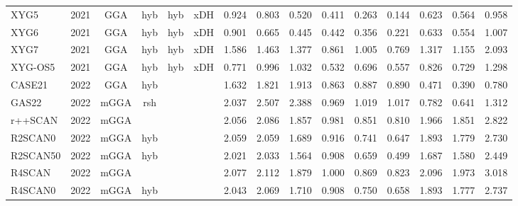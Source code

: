 \begin{landscape}
\begin{longtable}{lcccccrrrrrrrrr}
    XYG5             & 2021 & GGA  & hyb      & hyb         & xDH       & 0.924             & 0.803             & 0.520  & 0.411              & 0.263             & 0.144  & 0.623   & 0.564 & 0.958 \\
    XYG6             & 2021 & GGA  & hyb      & hyb         & xDH       & 0.901             & 0.665             & 0.445  & 0.442              & 0.356             & 0.221  & 0.633   & 0.554 & 1.007 \\
    XYG7             & 2021 & GGA  & hyb      & hyb         & xDH       & 1.586             & 1.463             & 1.377  & 0.861              & 1.005             & 0.769  & 1.317   & 1.155 & 2.093 \\
    XYG-OS5          & 2021 & GGA  & hyb      & hyb         & xDH       & 0.771             & 0.996             & 1.032  & 0.532              & 0.696             & 0.557  & 0.826   & 0.729 & 1.298 \\
    CASE21           & 2022 & GGA  & hyb      &             &           & 1.632             & 1.821             & 1.913  & 0.863              & 0.887             & 0.890  & 0.471   & 0.390 & 0.780 \\
    GAS22            & 2022 & mGGA & rsh      &             &           & 2.037             & 2.507             & 2.388  & 0.969              & 1.019             & 1.017  & 0.782   & 0.641 & 1.312 \\
    r++SCAN          & 2022 & mGGA &          &             &           & 2.056             & 2.086             & 1.857  & 0.981              & 0.851             & 0.810  & 1.966   & 1.851 & 2.822 \\
    R2SCAN0          & 2022 & mGGA & hyb      &             &           & 2.059             & 2.059             & 1.689  & 0.916              & 0.741             & 0.647  & 1.893   & 1.779 & 2.730 \\
    R2SCAN50         & 2022 & mGGA & hyb      &             &           & 2.021             & 2.033             & 1.564  & 0.908              & 0.659             & 0.499  & 1.687   & 1.580 & 2.449 \\
    R4SCAN           & 2022 & mGGA &          &             &           & 2.077             & 2.112             & 1.879  & 1.000              & 0.869             & 0.823  & 2.096   & 1.973 & 3.018 \\
    R4SCAN0          & 2022 & mGGA & hyb      &             &           & 2.043             & 2.069             & 1.710  & 0.908              & 0.750             & 0.658  & 1.893   & 1.777 & 2.737
\end{longtable}

\end{landscape}
